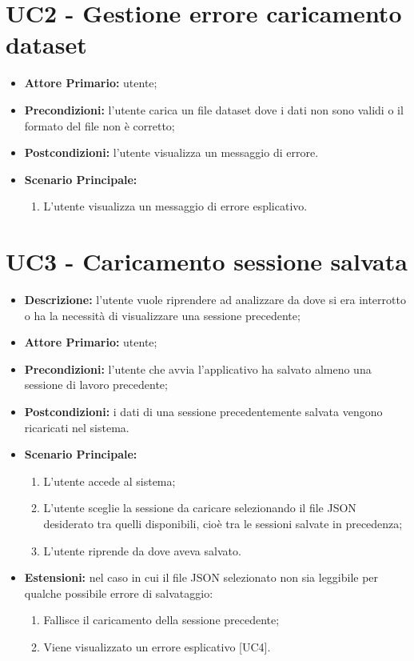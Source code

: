 \section{UC2 - Gestione errore caricamento dataset}
\begin{itemize}
  \item \textbf{Attore Primario:} utente;
  \item \textbf{Precondizioni:} l'utente carica un file dataset dove i dati non sono validi o il formato del file non è corretto;
  \item \textbf{Postcondizioni:} l'utente visualizza un messaggio di errore.
  \item \textbf{Scenario Principale:}
  \begin{enumerate}
    \item L'utente visualizza un messaggio di errore esplicativo.
  \end{enumerate}
\end{itemize}

\section{UC3 - Caricamento sessione salvata}
\begin{itemize}
  \item \textbf{Descrizione:} l'utente vuole riprendere ad analizzare da dove si era interrotto
  o ha la necessità di visualizzare una sessione precedente;
  \item \textbf{Attore Primario:} utente;
  \item \textbf{Precondizioni:} l'utente che avvia l'applicativo ha salvato almeno una sessione di lavoro precedente;
  \item \textbf{Postcondizioni:} i dati di una sessione precedentemente salvata vengono ricaricati nel sistema.
  \item \textbf{Scenario Principale:}
  \begin{enumerate}
    \item L'utente accede al sistema;
    \item L'utente sceglie la sessione da caricare selezionando il file JSON desiderato tra quelli disponibili,
    cioè tra le sessioni salvate in precedenza;
    \item L'utente riprende da dove aveva salvato.
  \end{enumerate}
  \item \textbf{Estensioni:} nel caso in cui il file JSON selezionato non sia leggibile per qualche possibile errore di salvataggio:
    \begin{enumerate}
      \item Fallisce il caricamento della sessione precedente;
      \item Viene visualizzato un errore esplicativo [UC4].
    \end{enumerate}
\end{itemize}

